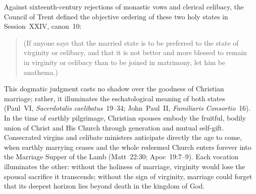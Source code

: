 Against sixteenth-century rejections of monastic vows and clerical celibacy, the Council of Trent defined the objective ordering of these two holy states in Session~XXIV, canon~10:
\begin{quotation}
 (If anyone says that the married state is to be preferred to the state of virginity or celibacy, and that it is not better and more blessed to remain in virginity or celibacy than to be joined in matrimony, let him be anathema.)
\end{quotation}
This dogmatic judgment casts no shadow over the goodness of Christian marriage; rather, it illuminates the eschatological meaning of both states (Paul~VI, \emph{Sacerdotalis caelibatus}~19--34; John~Paul~II, \emph{Familiaris Consortio}~16). In the time of earthly pilgrimage, Christian spouses embody the fruitful, bodily union of Christ and His Church through generation and mutual self-gift. Consecrated virgins and celibate ministers anticipate directly the age to come, when earthly marrying ceases and the whole redeemed Church enters forever into the Marriage Supper of the Lamb (Matt~22:30; Apoc~19:7--9). Each vocation illuminates the other: without the holiness of marriage, virginity would lose the spousal sacrifice it transcends; without the sign of virginity, marriage could forget that its deepest horizon lies beyond death in the kingdom of God.
